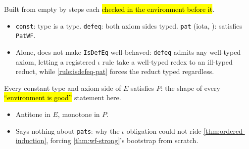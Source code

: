 \begin{definition}
\label{def:ordered}
\leanok
{}

 Built from empty by steps each \hl{checked in the environment before it}.
\begin{itemize}
\item \texttt{const}: type is a type. \texttt{defeq}: both axiom sides typed. \texttt{pat}
  (iota, ): satisfies \texttt{PatWF}.
\item {} Alone, does not make \texttt{IsDefEq} well-behaved: \texttt{defeq} admits
  any well-typed axiom, letting a registered $\iota$ rule take a well-typed redex to an
  ill-typed reduct, while \ref{rule:isdefeq-pat} forces the reduct typed regardless.
\end{itemize}
\end{definition}

\begin{definition}
\label{def:ontypes}
\leanok
{}

 Every constant type and axiom side of $E$ satisfies $P$: the shape of every
\hl{``environment is good''} statement here.
\begin{itemize}
\item Antitone in $E$, monotone in $P$.
\item {} Says nothing about \texttt{pats}: why the $\iota$ obligation could not
  ride \ref{thm:ordered-induction}, forcing \ref{thm:wf-strong}'s bootstrap from scratch.
\end{itemize}
\end{definition}

